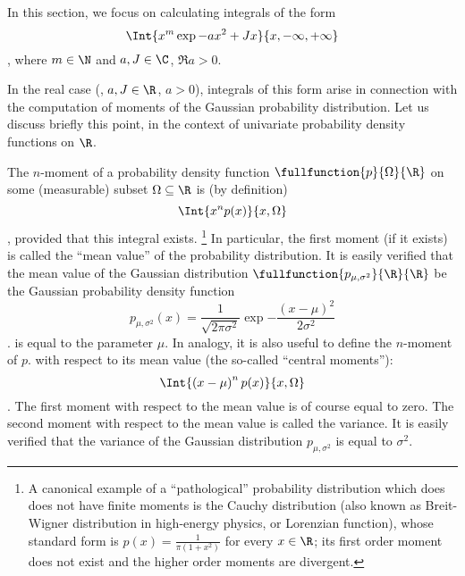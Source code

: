 In this section, we focus on calculating integrals of the form
\begin{dmath*}
   \Int{ x^{m} \exp{ - ax^{2} + Jx} }{x, -\infty, +\infty}
\end{dmath*},
where $m\in\N$ and $a,J\in\C$, $\Re a>0$. 

In the real case (\ie, $a,J\in\R$, $a>0$), integrals of this form arise in
connection with the
computation of moments of the Gaussian probability distribution.
Let us discuss briefly this point, in the context of univariate 
probability density functions on $\R$.

The   $n$\ordth-moment of a
probability density function $\fullfunction{p}{\Omega}{\R}$
on some (measurable) subset $\Omega\subseteq\R$ is (by definition)
\begin{dmath*}
   \Int{ x^{n} p (x) }{x, \Omega}
\end{dmath*},
provided that this integral exists.%
\footnote{A canonical example of a ``pathological'' probability distribution
   which does does not have finite moments is the Cauchy distribution (also known as
   Breit-Wigner distribution in high-energy physics, or Lorenzian function),
   whose standard form is $p(x) = \frac{1}{\pi \left( 1+x^{2} \right)}$
   for every $x\in\R$; its first order moment does not exist and the higher
   order moments are divergent.}
In particular, the first moment (if it exists) is called the ``mean value'' of the probability
distribution.
It is easily verified that the mean value of the Gaussian distribution
$\fullfunction{p_{\mu,
   \sigma^{2}}}{\R}{\R}$ be the Gaussian probability density function 
\begin{dmath*}
   p_{\mu, \sigma^{2}}(x) = \frac{1}{\sqrt{2\pi\sigma^{2}}} \exp{ - \frac{\left(
	    x-\mu\right)^{2}}{2\sigma^{2}}} 
\end{dmath*}.
is equal to the parameter $\mu$.
In analogy, it is also useful to define the $n$\ordth-moment of $p$.
with respect to its mean value (the so-called ``central moments''):
\begin{dmath*}
   \Int{ \left( x-\mu\right)^{n} p (x) }{x,\Omega} 
\end{dmath*}.
The first moment with respect to the mean value is of course equal to zero.
The second moment with respect to the mean value is called the variance.
It is easily verified that the variance of the Gaussian distribution $p_{\mu,
   \sigma^{2}}$ is equal to $\sigma^{2}$.

